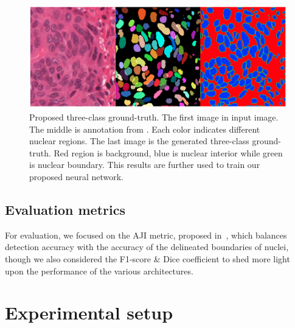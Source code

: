 \begin{figure}[thb]
    \centering
    \includegraphics[width=\textwidth]{resources/5_3_classes.png}
    \caption{Proposed three-class ground-truth. The first image in input image. The middle is annotation from \cite{he_dataset_kumar}. Each color indicates different nuclear regions. The last image is the generated three-class ground-truth. Red region is background, blue is nuclear interior while green is nuclear boundary. This results are further used to train our proposed neural network.}
    \label{fig:three_class}
\end{figure}

\subsection{Evaluation metrics}

For evaluation, we focused on the AJI metric, proposed in~\cite{he_dataset_kumar}, which balances detection accuracy with the accuracy of the delineated boundaries of nuclei, though we also considered the F1-score \& Dice coefficient to shed more light upon the performance of the various architectures.

\section{Experimental setup} 
\label{sec:setup}

